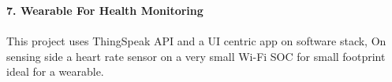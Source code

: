 \documentclass[10pt]{report}
\begin{document}
\noindent\textbf{\large 7. Wearable For Health Monitoring \\[1pt]}
\\This project uses ThingSpeak API and a UI centric app on software stack, On sensing side a heart rate sensor on a very small Wi-Fi SOC for small footprint ideal for a wearable.



  
\end{document}

